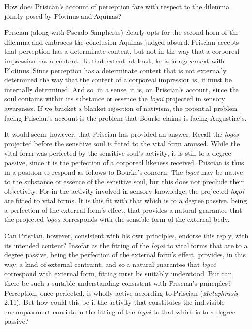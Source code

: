 \documentclass[12pt]{article}
\begin{document}
How does Prisican's account of perception fare with respect to the dilemma jointly posed by Plotinus and Aquinas?

Priscian (along with Pseudo-Simplicius) clearly opts for the second horn of the dilemma and embraces the conclusion Aquinas judged absurd. Priscian accepts that perception has a determinate content, but not in the way that a corporeal impression has a content. To that extent, at least, he is in agreement with Plotinus. Since perception has a determinate content that is not externally determined the way that the content of a corporeal impression is, it must be internally determined. And so, in a sense, it is, on Priscian's account, since the soul contains within its substance or essence the \emph{logoi} projected in sensory awareness. If we bracket a blanket rejection of nativism, the potential problem facing Priscian's account is the problem that Bourke claims is facing Augustine's.

It would seem, however, that Priscian has provided an answer. Recall the \emph{logos} projected before the sensitive soul is fitted to the vital form aroused. While the vital form was perfected by the sensitive soul's activity, it is still to a degree passive, since it is the perfection of a corporeal likeness received. Priscian is thus in a position to respond as follows to Bourke's concern. The \emph{logoi} may be native to the substance or essence of the sensitive soul, but this does not preclude their objectivity. For in the activity involved in sensory knowledge, the projected \emph{logoi} are fitted to vital forms. It is this fit with that which is to a degree passive, being a perfection of the external form's effect, that provides a natural guarantee that the projected \emph{logos} corresponds with the sensible form of the external body.

Can Priscian, however, consistent with his own principles, endorse this reply, with its intended content? Insofar as the fitting of the \emph{logoi} to vital forms that are to a degree passive, being the perfection of the external form's effect, provides, in this way, a kind of external contraint, and so a natural guarantee that \emph{logoi} correspond with external form, fitting must be suitably understood. But can there be such a suitable understanding consistent with Priscian's principles? Perception, once perfected, is wholly active according to Priscian (\emph{Metaphrasis} 2.11). But how could this be if the activity that constitutes the indivisible encompassment consists in the fitting of the \emph{logoi} to that which is to a degree passive?
\end{document}
